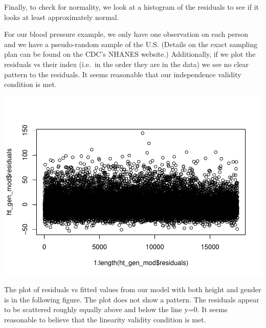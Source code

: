 \documentclass[
]{book}
\newenvironment{Shaded}{\begin{snugshade}}{\end{snugshade}}
\newcommand{\DecValTok}[1]{\textcolor[rgb]{0.00,0.00,0.81}{#1}}
\newcommand{\FunctionTok}[1]{\textcolor[rgb]{0.00,0.00,0.00}{#1}}
\newcommand{\NormalTok}[1]{#1}
\newcommand{\SpecialCharTok}[1]{\textcolor[rgb]{0.00,0.00,0.00}{#1}}
\begin{document}
Finally, to check for normality, we look at a histogram of the residuals to see if it looks at least approximately normal.

For our blood pressure example, we only have one observation on each person and we have a pseudo-random sample of the U.S. (Details on the exact sampling plan can be found on the CDC's NHANES website.) Additionally, if we plot the residuals vs their index (i.e.~in the order they are in the data) we see no clear pattern to the residuals. It seems reasonable that our independence validity condition is met.

\begin{Shaded}
\end{Shaded}

\includegraphics{MA206supplement_files/figure-latex/unnamed-chunk-7-1.pdf}

The plot of residuals vs fitted values from our model with both height and gender is in the following figure. The plot does not show a pattern. The residuals appear to be scattered roughly equally above and below the line y=0. It seems reasonable to believe that the linearity validity condition is met.

\begin{Shaded}
\end{Shaded}
\end{document}
